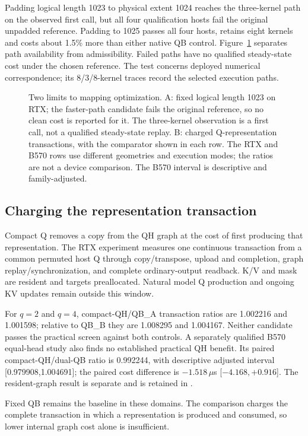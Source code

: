 Padding logical length 1023 to physical extent 1024 reaches the three-kernel path on the observed first call, but all four qualification hosts fail the original unpadded reference. Padding to 1025 passes all four hosts, retains eight kernels and costs about 1.5\% more than either native QB control. Figure~\ref{fig:mappingboundary} separates path availability from admissibility. Failed paths have no qualified steady-state cost under the chosen reference. The test concerns deployed numerical correspondence; its 8/3/8-kernel traces record the selected execution paths.

\begin{figure}[t]
\centering
\caption{Two limits to mapping optimization. A: fixed logical length 1023 on RTX; the faster-path candidate fails the original reference, so no clean cost is reported for it. The three-kernel observation is a first call, not a qualified steady-state replay. B: charged Q-representation transactions, with the comparator shown in each row. The RTX and B570 rows use different geometries and execution modes; the ratios are not a device comparison. The B570 interval is descriptive and family-adjusted.}
\label{fig:mappingboundary}
\end{figure}

\subsection{Charging the representation transaction}
Compact Q removes a copy from the QH graph at the cost of first producing that representation. The RTX experiment measures one continuous transaction from a common permuted host Q through copy/transpose, upload and completion, graph replay/synchronization, and complete ordinary-output readback. K/V and mask are resident and targets preallocated. Natural model Q production and ongoing KV updates remain outside this window.

For $q=2$ and $q=4$, compact-QH/QB\_A transaction ratios are 1.002216 and 1.001598; relative to QB\_B they are 1.008295 and 1.004167. Neither candidate passes the practical screen against both controls. A separately qualified B570 equal-head study also finds no established practical QH benefit. Its paired compact-QH/dual-QB ratio is 0.992244, with descriptive adjusted interval [0.979908,1.004691]; the paired cost difference is $-1.518\,\mu$s [$-4.168,+0.916$]. The resident-graph result is separate and is retained in .

Fixed QB remains the baseline in these domains. The comparison charges the complete transaction in which a representation is produced and consumed, so lower internal graph cost alone is insufficient.
